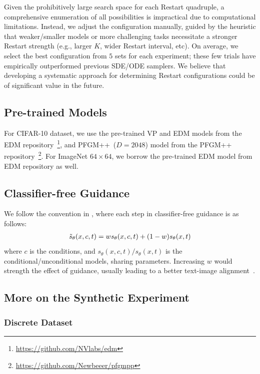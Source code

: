 Given the prohibitively large search space for each Restart quadruple, a comprehensive enumeration of all possibilities is impractical due to computational limitations. Instead, we adjust the configuration manually, guided by the heuristic that weaker/smaller models or more challenging tasks necessitate a stronger Restart strength (e.g., larger $K$, wider Restart interval, etc). On average, we select the best configuration from $5$ sets for each experiment; these few trials have empirically outperformed previous SDE/ODE samplers. We believe that developing a systematic approach for determining Restart configurations could be of significant value in the future.

\subsection{Pre-trained Models}

For CIFAR-10 dataset, we use the pre-trained VP and EDM models from the EDM repository~\footnote{\url{https://github.com/NVlabs/edm}}, and PFGM++~($D=2048$) model from the PFGM++ repository~\footnote{\url{https://github.com/Newbeeer/pfgmpp}}. For ImageNet $64\times 64$, we borrow the pre-trained EDM model from EDM repository as well.


\subsection{Classifier-free Guidance}

We follow the convention in \cite{Saharia2022PhotorealisticTD}, where each step in classifier-free guidance is as follows:
\begin{align*}
    \Tilde{s}_\theta(x,c, t) = w{s}_\theta(x,c, t) + (1-w){s}_\theta(x, t)
\end{align*}
where $c$ is the conditions, and ${s}_\theta(x,c, t)/{s}_\theta(x, t)$ is the conditional/unconditional models, sharing parameters. Increasing $w$ would strength the effect of guidance, usually leading to a better text-image alignment~\cite{Saharia2022PhotorealisticTD}.

\subsection{More on the Synthetic Experiment}
\label{app:syn}

\subsubsection{Discrete Dataset}


